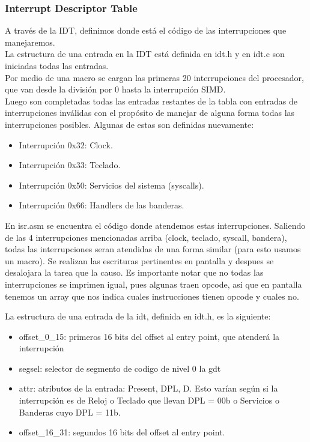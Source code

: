 \subsubsection{Interrupt Descriptor Table}
A trav\'es de la IDT, definimos donde est\'a el c\'odigo de las interrupciones que manejaremos.\\
La estructura de una entrada en la IDT est\'a definida en idt.h y en idt.c son iniciadas todas las entradas.\\
Por medio de una macro se cargan las primeras 20 interrupciones del procesador, que van desde la divisi\'on por 0 hasta la interrupci\'on SIMD.\\
Luego son completadas todas las entradas restantes de la tabla con entradas de interrupciones inv\'alidas con el prop\'osito de manejar 
de alguna forma todas las interrupciones posibles. Algunas de estas son definidas nuevamente:\\
\begin{itemize}
 \item Interrupci\'on 0x32: Clock.
 \item Interrupci\'on 0x33: Teclado.
 \item Interrupci\'on 0x50: Servicios del sistema (syscalls).
 \item Interrupci\'on 0x66: Handlers de las banderas.
\end{itemize}

En isr.asm se encuentra el c\'odigo donde atendemos estas interrupciones. Saliendo de las 4 interrupciones mencionadas arriba (clock, teclado, syscall, bandera),
todas las interrupciones seran atendidas de una forma similar (para esto usamos un macro). Se realizan las escrituras pertinentes en pantalla y despues se desalojara la 
tarea que la causo. Es importante notar que no todas las interrupciones se imprimen igual, pues algunas traen opcode, asi que en pantalla tenemos un array que nos indica
cuales instrucciones tienen opcode y cuales no.

La estructura de una entrada de la idt, definida en idt.h, es la siguiente:\\
\begin{itemize}
 \item offset\_0\_15: primeros 16 bits del offset al entry point, que atender\'a la interrupci\'on
 \item segsel: selector de segmento de codigo de nivel 0 la gdt
 \item attr: atributos de la entrada: Present, DPL, D. Esto var\'ian seg\'un si la interrupci\'on es de Reloj o Teclado que llevan DPL = 00b
o Servicios o Banderas  cuyo DPL = 11b.
 \item offset\_16\_31: segundos 16 bits del offset al entry point.
\end{itemize}


